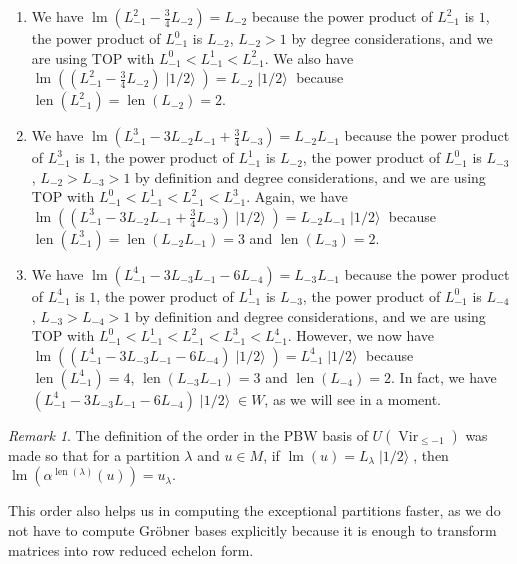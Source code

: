 \documentclass[a4paper, 12pt, reqno]{amsart}
\theoremstyle{remark}
\newtheorem{remark}[theorem]{Remark}
\DeclareMathOperator{\Vir}{Vir}
\DeclareMathOperator{\lm}{lm}
\DeclareMathOperator{\len}{len}
\DeclareMathOperator{\vachalf}{|1/2\rangle}
\begin{document}
\begin{enumerate}
\item We have $\lm(L_{-1}^2 - \frac{3}{4}L_{-2}) = L_{-2}$ because the power product of $L_{-1}^2$ is $1$, the power product of $L_{-1}^0$ is $L_{-2}$, $L_{-2} > 1$ by degree considerations, and we are using TOP with $L_{-1}^0 < L_{-1}^1 < L_{-1}^2$.
  We also have $\lm((L_{-1}^2 - \frac{3}{4}L_{-2})\vachalf) = L_{-2}\vachalf$ because $\len(L_{-1}^2) = \len(L_{-2}) = 2$.
\item We have $\lm(L_{-1}^3 - 3L_{-2}L_{-1} + \frac{3}{4}L_{-3}) = L_{-2}L_{-1}$ because the power product of $L_{-1}^3$ is $1$, the power product of $L_{-1}^1$ is $L_{-2}$, the power product of $L_{-1}^0$ is $L_{-3}$, $L_{-2} > L_{-3} > 1$ by definition and degree considerations, and we are using TOP with $L_{-1}^0 < L_{-1}^1 < L_{-1}^2 < L_{-1}^3$.
  Again, we have $\lm((L_{-1}^3 - 3L_{-2}L_{-1} + \frac{3}{4}L_{-3})\vachalf) = L_{-2}L_{-1}\vachalf$ because $\len(L_{-1}^3) = \len(L_{-2}L_{-1}) = 3$ and $\len(L_{-3}) = 2$.
\item We have $\lm(L_{-1}^4 - 3L_{-3}L_{-1} - 6L_{-4}) = L_{-3}L_{-1}$ because the power product of $L_{-1}^4$ is $1$, the power product of $L_{-1}^1$ is $L_{-3}$, the power product of $L_{-1}^0$ is $L_{-4}$, $L_{-3} > L_{-4} > 1$ by definition and degree considerations, and we are using TOP with $L_{-1}^0 < L_{-1}^1 < L_{-1}^2 < L_{-1}^3 < L_{-1}^4$.
  However, we now have $\lm((L_{-1}^4 - 3L_{-3}L_{-1} - 6L_{-4})\vachalf) = L_{-1}^4\vachalf$ because $\len(L_{-1}^4) = 4$, $\len(L_{-3}L_{-1}) = 3$ and $\len(L_{-4}) = 2$.
  In fact, we have $(L_{-1}^4 - 3L_{-3}L_{-1} - 6L_{-4})\vachalf \in W$, as we will see in a moment.
\end{enumerate}

\begin{remark}
  \label{rmk:48}
  The definition of the order in the PBW basis of $U(\Vir_{\le -1})$ was made so that for a partition $\lambda$ and $u \in M$, if $\lm(u) = L_{\lambda}\vachalf$, then $\lm(\alpha^{\len(\lambda)}(u)) = u_{\lambda}$.

  This order also helps us in computing the exceptional partitions faster, as we do not have to compute Gröbner bases explicitly because it is enough to transform matrices into row reduced echelon form.
\end{remark}
\end{document}

